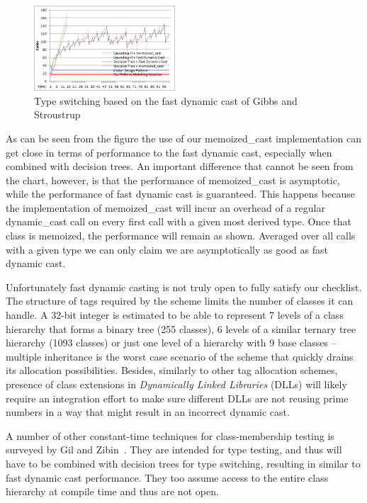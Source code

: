 \documentclass[preprint]{sigplanconf}
\begin{document}
\begin{figure}[htbp]
  \centering
    \includegraphics[width=0.47\textwidth]{DCast-vs-Visitors2.png}
  \caption{Type switching based on the fast dynamic cast of Gibbs and Stroustrup~\cite{FastDynCast}}
  \label{fig:DCastVis2}
\end{figure}

As can be seen from the figure the use of our memoized\_cast implementation can 
get close in terms of performance to the fast dynamic cast, especially 
when combined with decision trees. An important difference that cannot be seen 
from the chart, however, is that the performance of memoized\_cast is 
asymptotic, while the performance of fast dynamic cast is guaranteed. This 
happens because the implementation of memoized\_cast will incur an overhead of 
a regular dynamic\_cast call on every first call with a given most derived type. 
Once that class is memoized, the performance will remain as shown. Averaged over 
all calls with a given type we can only claim we are asymptotically as good as 
fast dynamic cast.

Unfortunately fast dynamic casting is not truly open to fully satisfy our 
checklist. The structure of tags required by the scheme limits the number of 
classes it can handle. A 32-bit integer is estimated to be able to represent 7 
levels of a class hierarchy that forms a binary tree (255 classes), 6 levels of 
a similar ternary tree hierarchy (1093 classes) or just one level of a hierarchy 
with 9 base classes -- multiple inheritance is the worst case scenario of the 
scheme that quickly drains its allocation possibilities. Besides, similarly to 
other tag allocation schemes, presence of class extensions in \emph{Dynamically Linked Libraries} (DLLs) will likely 
require an integration effort to make sure different DLLs are not reusing prime 
numbers in a way that might result in an incorrect dynamic cast.

A number of other constant-time techniques for class-membership testing is 
surveyed by Gil and Zibin~\cite[]{PQEncoding}. They are intended 
for type testing, and thus will have to be combined with decision trees 
for type switching, resulting in similar to fast dynamic cast performance. 
They too assume access to the entire class hierarchy at compile time and thus 
are not open.
\end{document}
